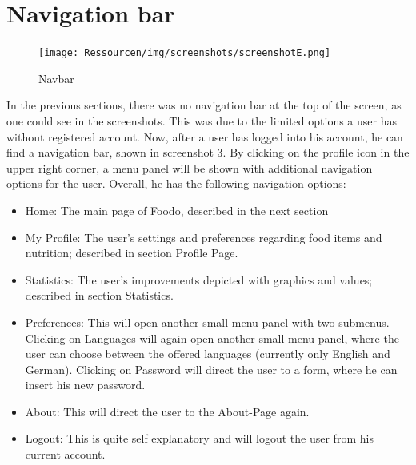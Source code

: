 \section*{Navigation bar}
\vspace{-2em}
\begin{figure}[H]
	\captionsetup{justification=centering}
	\begin{center}
		\texttt{[image: Ressourcen/img/screenshots/screenshotE.png]}
		\vspace{-3em}
		\caption{Navbar}
	\end{center}
\end{figure}
\vspace{-3em}
In the previous sections, there was no navigation bar at the top of the screen, as one could see in the screenshots. This was due to the limited options a user has without registered account. Now, after a user has logged into his account, he can find a navigation bar, shown in screenshot 3. By clicking on the profile icon in the upper right corner, a menu panel will be shown with additional navigation options for the user. Overall, he has the following navigation options:
\begin{itemize}
\item Home: The main page of Foodo, described in the next section
\item My Profile: The user's settings and preferences regarding food items and nutrition; described in section Profile Page.
\item Statistics: The user's improvements depicted with graphics and values; described in section Statistics.
\item Preferences: This will open another small menu panel with two submenus. Clicking on Languages will again open another small menu panel, where the user can choose between the offered languages (currently only English and German). Clicking on Password will direct the user to a form, where he can insert his new password.
\item About: This will direct the user to the About-Page again.
\item Logout: This is quite self explanatory and will logout the user from his current account.
\end{itemize}
